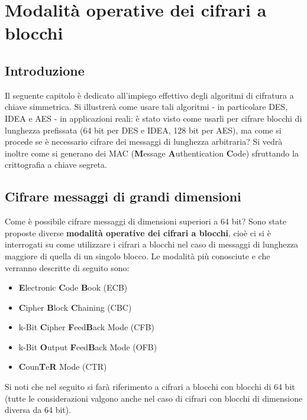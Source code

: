 \chapter{Modalità operative dei cifrari a blocchi} \label{ch:modes}

\section{Introduzione}
Il seguente capitolo è dedicato all'impiego effettivo degli algoritmi di cifratura a chiave simmetrica. Si illustrerà come usare tali algoritmi - in particolare DES, IDEA e AES - in applicazioni reali: è stato visto come usarli per cifrare blocchi di lunghezza prefissata (64 bit per DES e IDEA, 128 bit per AES), ma come si procede se è necessario cifrare dei messaggi di lunghezza arbitraria? \newline \newline
Si vedrà inoltre come si generano dei MAC (\textbf{M}essage \textbf{A}uthentication \textbf{C}ode) sfruttando la crittografia a chiave segreta.

\section{Cifrare messaggi di grandi dimensioni}
Come è possibile cifrare messaggi di dimensioni superiori a 64 bit? Sono state proposte diverse \textbf{modalità operative dei cifrari a blocchi}, cioè ci si è interrogati su come utilizzare i cifrari a blocchi nel caso di messaggi di lunghezza maggiore di quella di un singolo blocco.
\newline \newline
Le modalità più conosciute e che verranno descritte di seguito sono:
\begin{itemize}
  \item \textbf{E}lectronic \textbf{C}ode \textbf{B}ook (ECB)
  \item \textbf{C}ipher \textbf{B}lock \textbf{C}haining (CBC)
  \item k-Bit \textbf{C}ipher \textbf{F}eed\textbf{B}ack Mode (CFB)
  \item k-Bit \textbf{O}utput \textbf{F}eed\textbf{B}ack Mode (OFB)
  \item \textbf{C}oun\textbf{T}e\textbf{R} Mode (CTR)
\end{itemize} 
Si noti che nel seguito si farà riferimento a cifrari a blocchi con blocchi di 64 bit (tutte le considerazioni valgono anche nel caso di cifrari con blocchi di dimensione diversa da 64 bit).
